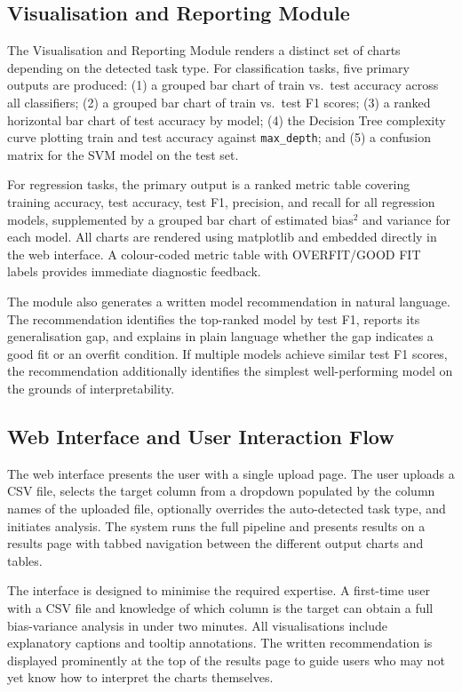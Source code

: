 \documentclass[conference]{IEEEtran}
\begin{document}
\subsection{Visualisation and Reporting Module}

The Visualisation and Reporting Module renders a distinct set of charts depending on the detected task type. For classification tasks, five primary outputs are produced: (1) a grouped bar chart of train vs.\ test accuracy across all classifiers; (2) a grouped bar chart of train vs.\ test F1 scores; (3) a ranked horizontal bar chart of test accuracy by model; (4) the Decision Tree complexity curve plotting train and test accuracy against \texttt{max\_depth}; and (5) a confusion matrix for the SVM model on the test set.

For regression tasks, the primary output is a ranked metric table covering training accuracy, test accuracy, test F1, precision, and recall for all regression models, supplemented by a grouped bar chart of estimated bias$^2$ and variance for each model. All charts are rendered using matplotlib and embedded directly in the web interface. A colour-coded metric table with OVERFIT/GOOD FIT labels provides immediate diagnostic feedback.

The module also generates a written model recommendation in natural language. The recommendation identifies the top-ranked model by test F1, reports its generalisation gap, and explains in plain language whether the gap indicates a good fit or an overfit condition. If multiple models achieve similar test F1 scores, the recommendation additionally identifies the simplest well-performing model on the grounds of interpretability.

\subsection{Web Interface and User Interaction Flow}

The web interface presents the user with a single upload page. The user uploads a CSV file, selects the target column from a dropdown populated by the column names of the uploaded file, optionally overrides the auto-detected task type, and initiates analysis. The system runs the full pipeline and presents results on a results page with tabbed navigation between the different output charts and tables.

The interface is designed to minimise the required expertise. A first-time user with a CSV file and knowledge of which column is the target can obtain a full bias-variance analysis in under two minutes. All visualisations include explanatory captions and tooltip annotations. The written recommendation is displayed prominently at the top of the results page to guide users who may not yet know how to interpret the charts themselves.
\end{document}
